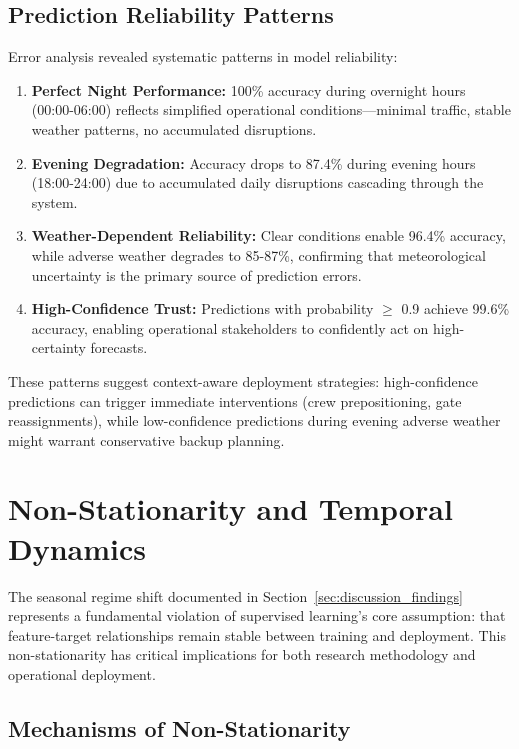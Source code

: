 \documentclass{report}
\begin{document}
\subsection{Prediction Reliability Patterns}

Error analysis revealed systematic patterns in model reliability:

\begin{enumerate}
    \item \textbf{Perfect Night Performance:} 100\% accuracy during overnight hours (00:00-06:00) reflects simplified operational conditions—minimal traffic, stable weather patterns, no accumulated disruptions.
    
    \item \textbf{Evening Degradation:} Accuracy drops to 87.4\% during evening hours (18:00-24:00) due to accumulated daily disruptions cascading through the system.
    
    \item \textbf{Weather-Dependent Reliability:} Clear conditions enable 96.4\% accuracy, while adverse weather degrades to 85-87\%, confirming that meteorological uncertainty is the primary source of prediction errors.
    
    \item \textbf{High-Confidence Trust:} Predictions with probability $\geq$ 0.9 achieve 99.6\% accuracy, enabling operational stakeholders to confidently act on high-certainty forecasts.
\end{enumerate}

These patterns suggest context-aware deployment strategies: high-confidence predictions can trigger immediate interventions (crew prepositioning, gate reassignments), while low-confidence predictions during evening adverse weather might warrant conservative backup planning.

\section{Non-Stationarity and Temporal Dynamics}
\label{sec:nonstationarity}

The seasonal regime shift documented in Section~\ref{sec:discussion_findings} represents a fundamental violation of supervised learning's core assumption: that feature-target relationships remain stable between training and deployment. This non-stationarity has critical implications for both research methodology and operational deployment.

\subsection{Mechanisms of Non-Stationarity}
\end{document}

